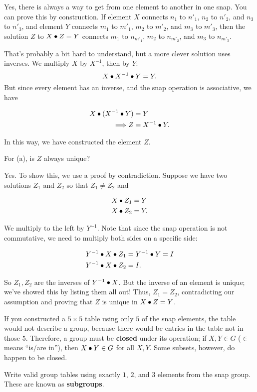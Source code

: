\documentclass[../gatm_answers.tex]{subfiles}
\begin{document}
\noindent Yes, there is always a way to get from one element to another in one snap. You can prove this by construction. If element $X$ connects $n_1$ to $n'_1$, $n_2$ to $n'_2$, and $n_3$ to $n'_3$, and element $Y$ connects $m_1$ to $m'_1$, $m_2$ to $m'_2$, and $m_3$ to $m'_3$, then the solution $Z$ to $X\bullet Z=Y$ connects $m_1$ to $n_{m'_1}$, $m_2$ to $n_{m'_2}$, and $m_3$ to $n_{m'_3}$.

That's probably a bit hard to understand, but a more clever solution uses inverses. We multiply $X$ by $X^{-1}$, then by $Y$: $$X\bullet X^{-1}\bullet Y = Y.$$ But since every element has an inverse, and the snap operation is associative, we have

\begin{align*}
X\bullet (X^{-1} \bullet Y) &= Y \\
\Longrightarrow Z &= X^{-1} \bullet Y.
\end{align*}

\noindent In this way, we have constructed the element $Z$.

\begin{inner_problem}
	\item For (a), is $Z$ always unique?
\end{inner_problem}

\noindent Yes. To show this, we use a proof by contradiction. Suppose we have two solutions $Z_1$ and $Z_2$ so that $Z_1\neq Z_2$ and

\begin{align*}
X\bullet Z_1 &= Y \\
X\bullet Z_2 &= Y.
\end{align*}

\noindent We multiply to the left by $Y^{-1}$. Note that since the snap operation is not commutative, we need to multiply both sides on a specific side:

\begin{align*}
Y^{-1} \bullet X\bullet Z_1 &= Y^{-1} \bullet Y = I \\
Y^{-1} \bullet X\bullet Z_2 &= I.
\end{align*}

\noindent So $Z_1,Z_2$ are the inverses of $Y^{-1}\bullet X$. But the inverse of an element is unique; we've showed this by listing them all out! Thus, $Z_1=Z_2$, contradicting our assumption and proving that $Z$ is unique in $X\bullet Z = Y$.

\begin{outer_problem}
	\item If you constructed a $5\times 5$ table using only $5$ of the snap elements, the table would not describe a group, because there would be entries in the table not in those $5$.
	      Therefore, a group must be \textbf{closed} under its operation; if $X,Y\in G$ ($\in$ means ``is/are in''), then $X\bullet Y\in G$ for all $X,Y$.
	      Some subsets, however, do happen to be closed.

	      Write valid group tables using exactly $1$, $2$, and $3$ elements from the snap group. These are known as \textbf{subgroups}.\label{prob:group_definition_end}
\end{outer_problem}
\end{document}
